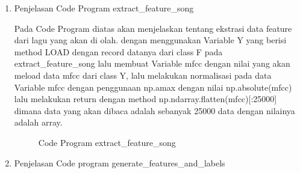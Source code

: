 \begin{enumerate}
\subitem dengan menggunakan code ini akan menampilkan hasil dari penggunaan display mfcc



\subitem hasilnya adalah sebagai berikut, dengan menampilkan data dari file disco.00035.au dapat dilihat pada gambar \ref{f10} :

\begin{figure}[!htbp]
      \caption{Hasil dari Code Program display\_mfcc}
      \label{f10}
\end{figure}

\item Penjelasan Code Program extract\_feature\_song



\subitem Pada Code Program diatas akan menjelaskan tentang ekstrasi data feature dari lagu yang akan di olah. dengan menggunakan Variable Y yang berisi method LOAD dengan record datanya dari class F pada extract\_feature\_song lalu membuat Variable mfcc dengan nilai yang akan meload data mfcc dari class Y, lalu melakukan normalisasi pada data Variable mfcc dengan penggunaan np.amax dengan nilai np.absolute(mfcc) lalu melakukan return dengan method np.ndarray.flatten(mfcc)[:25000] dimana data yang akan dibaca adalah sebanyak 25000 data dengan nilainya adalah array.

\begin{figure}[!htbp]
      \caption{Code Program extract\_feature\_song}
      \label{f11}
\end{figure}


\item Penjelasan Code program  generate\_features\_and\_labels


\end{enumerate}
